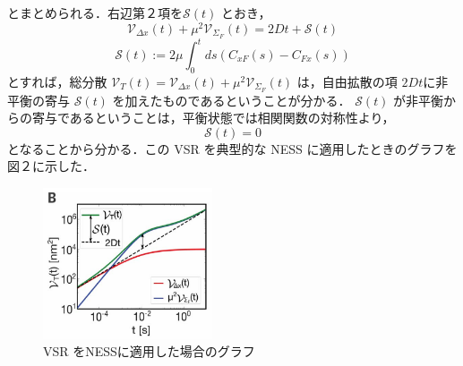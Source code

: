 \documentclass{jsarticle}
\numberwithin{equation}{section}
\theoremstyle{definition}
\begin{document}
とまとめられる．右辺第２項を$\mathcal{S} (t)$ とおき，
\begin{equation}
  \label{vsr2}
  \mathcal{V} _{\Delta x} (t) + \mu^2 \mathcal{V} _{\Sigma_F} (t) = 2Dt + \mathcal{S} (t)
\end{equation}
\begin{equation}
  \mathcal{S} (t) := 2\mu \int_0^t ds ( C_{xF} (s) - C_{Fx} (s) )
\end{equation}
とすれば，総分散 $\mathcal{V}_T (t) = \mathcal{V} _{\Delta x} (t) + \mu^2 \mathcal{V} _{\Sigma_F} (t)$ は，自由拡散の項 $2Dt $に非平衡の寄与 $\mathcal{S} (t)$ を加えたものであるということが分かる．
$\mathcal{S} (t)$ が非平衡からの寄与であるということは，平衡状態では相関関数の対称性より，
\begin{equation}
  \mathcal{S} (t) = 0
\end{equation}
となることから分かる．この VSR を典型的な NESS に適用したときのグラフを図２に示した．

\begin{figure}[H]
  \begin{center}  
  \includegraphics[width=5cm]{vsr_fig1b.png}  
  \end{center}
  \caption{VSR をNESSに適用した場合のグラフ}
\end{figure}
\end{document}
